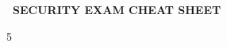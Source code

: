 \documentclass[8pt,a4paper]{extarticle}
\newcommand{\bodyfont}{\fontsize{4.18pt}{4.6pt}\selectfont}
\begin{document}
\bodyfont
\raggedright
\begin{center}\colorbox{secblue}{\color{white}\bfseries\ SECURITY EXAM CHEAT SHEET\ }\end{center}
\vspace{-2pt}
\begin{multicols}{5}


\end{multicols}
\end{document}
